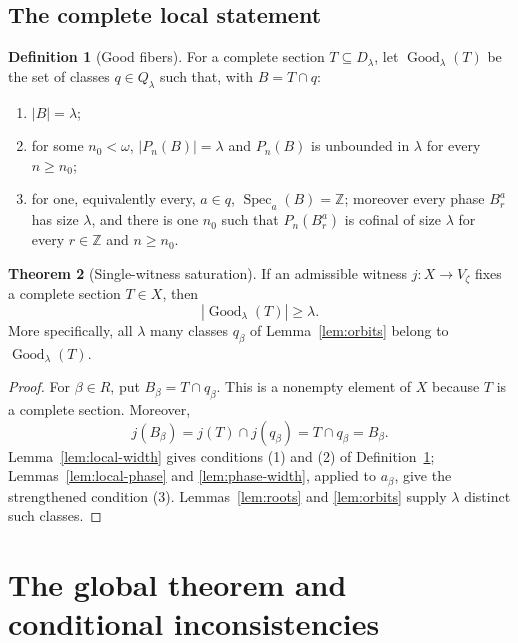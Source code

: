\documentclass[11pt,letterpaper]{article}
\theoremstyle{definition}
\newtheorem{definition}{Definition}[section]
\newtheorem{theorem}[definition]{Theorem}
\numberwithin{equation}{section}
\newcommand{\ZZ}{\mathbb Z}
\newcommand{\Spec}{\operatorname{Spec}}
\newcommand{\Good}{\operatorname{Good}}
\begin{document}
\subsection{The complete local statement}

\begin{definition}[Good fibers]\label{def:good}
For a complete section $T\subseteq D_\lambda$, let $\Good_\lambda(T)$ be the set of classes $q\in Q_\lambda$ such that, with $B=T\cap q$:
\begin{enumerate}
\item $|B|=\lambda$;
\item for some $n_0<\omega$, $|P_n(B)|=\lambda$ and $P_n(B)$ is unbounded in $\lambda$ for every $n\ge n_0$;
\item for one, equivalently every, $a\in q$, $\Spec_a(B)=\ZZ$; moreover every phase $B_r^a$ has size $\lambda$, and there is one $n_0$ such that $P_n(B_r^a)$ is cofinal of size $\lambda$ for every $r\in\ZZ$ and $n\ge n_0$.
\end{enumerate}
\end{definition}

\begin{theorem}[Single-witness saturation]\label{thm:local}
If an admissible witness $j:X\to V_\zeta$ fixes a complete section $T\in X$, then
\[
|\Good_\lambda(T)|\ge\lambda.
\]
More specifically, all $\lambda$ many classes $q_\beta$ of Lemma~\ref{lem:orbits} belong to $\Good_\lambda(T)$.
\end{theorem}
\begin{proof}
For $\beta\in R$, put $B_\beta=T\cap q_\beta$. This is a nonempty element of $X$ because $T$ is a complete section. Moreover,
\[
j(B_\beta)=j(T)\cap j(q_\beta)=T\cap q_\beta=B_\beta.
\]
Lemma~\ref{lem:local-width} gives conditions (1) and (2) of Definition~\ref{def:good}; Lemmas~\ref{lem:local-phase} and \ref{lem:phase-width}, applied to $a_\beta$, give the strengthened condition (3). Lemmas~\ref{lem:roots} and \ref{lem:orbits} supply $\lambda$ distinct such classes.
\end{proof}

\section{The global theorem and conditional inconsistencies}\label{sec:main}
\end{document}
